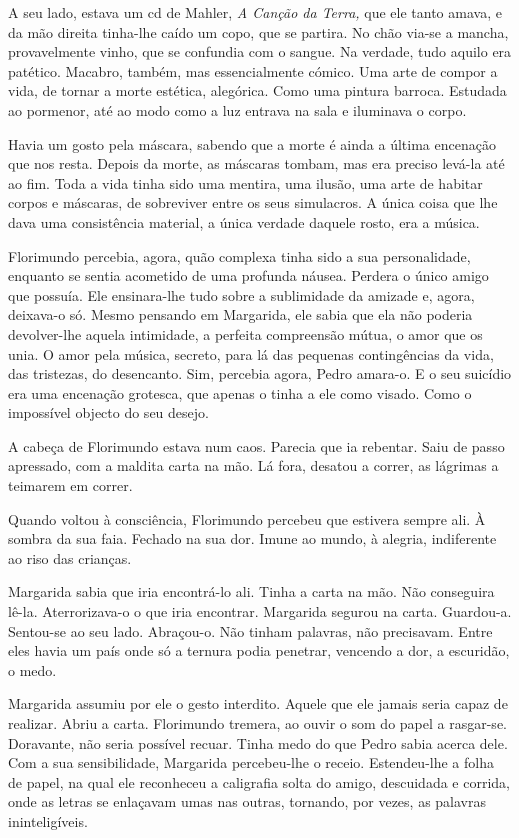 A seu lado, estava um cd de Mahler, \emph{A Canção da Terra, }que ele
tanto amava, e da mão direita tinha-lhe caído um copo, que se partira.
No chão via-se a mancha, provavelmente vinho, que se confundia com o
sangue. Na verdade, tudo aquilo era patético. Macabro, também, mas
essencialmente cómico. Uma arte de compor a vida, de tornar a morte
estética, alegórica. Como uma pintura barroca. Estudada ao pormenor, até
ao modo como a luz entrava na sala e iluminava o corpo.

Havia um gosto pela máscara, sabendo que a morte é ainda a última
encenação que nos resta. Depois da morte, as máscaras tombam, mas era
preciso levá-la até ao fim. Toda a vida tinha sido uma mentira, uma
ilusão, uma arte de habitar corpos e máscaras, de sobreviver entre os
seus simulacros. A única coisa que lhe dava uma consistência material, a
única verdade daquele rosto, era a música.

Florimundo percebia, agora, quão complexa tinha sido a sua
personalidade, enquanto se sentia acometido de uma profunda náusea.
Perdera o único amigo que possuía. Ele ensinara-lhe tudo sobre a
sublimidade da amizade e, agora, deixava-o só. Mesmo pensando em
Margarida, ele sabia que ela não poderia devolver-lhe aquela intimidade,
a perfeita compreensão mútua, o amor que os unia. O amor pela música,
secreto, para lá das pequenas contingências da vida, das tristezas, do
desencanto. Sim, percebia agora, Pedro amara-o. E o seu suicídio era uma
encenação grotesca, que apenas o tinha a ele como visado. Como o
impossível objecto do seu desejo.

A cabeça de Florimundo estava num caos. Parecia que ia rebentar. Saiu de
passo apressado, com a maldita carta na mão. Lá fora, desatou a correr,
as lágrimas a teimarem em correr.

Quando voltou à consciência, Florimundo percebeu que estivera sempre
ali. À sombra da sua faia. Fechado na sua dor. Imune ao mundo, à
alegria, indiferente ao riso das crianças.

Margarida sabia que iria encontrá-lo ali. Tinha a carta na mão. Não
conseguira lê-la. Aterrorizava-o o que iria encontrar. Margarida segurou
na carta. Guardou-a. Sentou-se ao seu lado. Abraçou-o. Não tinham
palavras, não precisavam. Entre eles havia um país onde só a ternura
podia penetrar, vencendo a dor, a escuridão, o medo.

Margarida assumiu por ele o gesto interdito. Aquele que ele jamais seria
capaz de realizar. Abriu a carta. Florimundo tremera, ao ouvir o som do
papel a rasgar-se. Doravante, não seria possível recuar. Tinha medo do
que Pedro sabia acerca dele. Com a sua sensibilidade, Margarida
percebeu-lhe o receio. Estendeu-lhe a folha de papel, na qual ele
reconheceu a caligrafia solta do amigo, descuidada e corrida, onde as
letras se enlaçavam umas nas outras, tornando, por vezes, as palavras
ininteligíveis.

